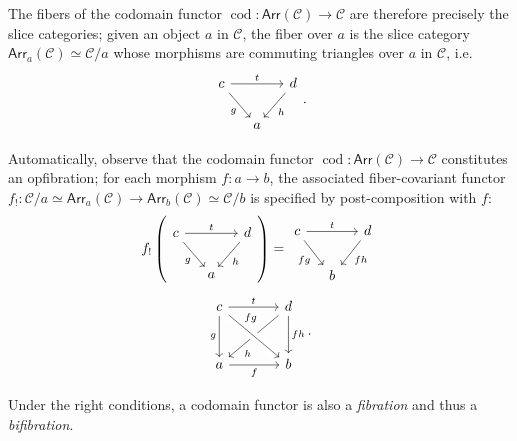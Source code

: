 \documentclass[12pt]{article}
\theoremstyle{definition}
\theoremstyle{remark}
\DeclareMathOperator{\cod}{cod}
\newcommand{\arr}{\mathsf{Arr}} %
\newcommand{\catC}{\mathcal{C}}
\begin{document}
The fibers of the codomain functor $\cod : \arr(\catC) \to \catC$ are therefore precisely the slice categories; given an object $a$ in $\catC$, the fiber over $a$ is the slice category $\arr_{a}(\catC) \simeq \catC / a$ whose morphisms are commuting triangles over $a$ in $\catC$, i.e.
\begin{equation}
    \begin{tikzcd}[column sep=small]
        c \ar[dr, "g"'] \ar[rr, "t"] & & d \ar[dl, "h"] \\
        & a &
    \end{tikzcd}.
\end{equation}

Automatically, observe that the codomain functor $\cod : \arr(\catC) \to \catC$ constitutes an opfibration; for each morphism $f : a \to b$, the associated fiber-covariant functor $f_{!} : \catC / a \simeq \arr_{a}(\catC) \to \arr_{b}(\catC) \simeq \catC / b$ is specified by post-composition with $f$:
\begin{equation}
    f_! \left(
        \begin{tikzcd}[column sep=small]
            c \ar[dr, "g"'] \ar[rr, "t"] & & d \ar[dl, "h"] \\
            & a &
        \end{tikzcd}
    \right)
    =
    \begin{tikzcd}[column sep=small]
    c \ar[dr, "f g"'] \ar[rr, "t"] & & d \ar[dl, "f h"] \\
    & b &
    \end{tikzcd}
\end{equation}
\begin{equation}
    \begin{tikzcd}[sep=large]
        c \ar[d, "g"'] \ar[r, "t"] & d \ar[dl, "h", near end] \ar[d, "f h"] \\
        a \ar[r, "f"'] & b \ar[from=ul, "f g", near start, crossing over]
    \end{tikzcd}.
\end{equation}

Under the right conditions, a codomain functor is also a \textit{fibration} and thus a \textit{bifibration}.
\end{document}
